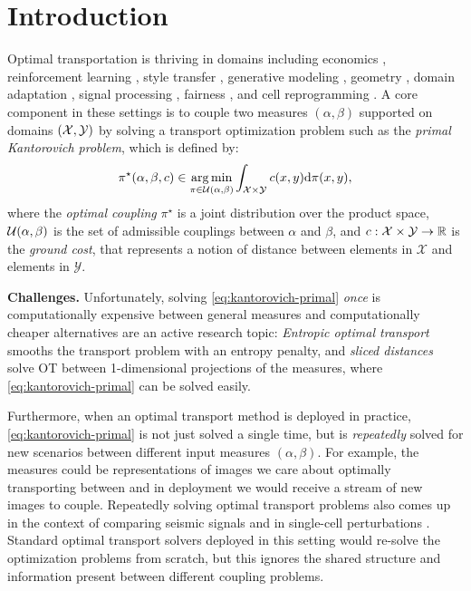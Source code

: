 \documentclass{article}
\begin{document}
\section{Introduction}
Optimal transportation \citep{villani2009optimal,ambrosio2003lecture,santambrogio2015optimal,peyre2019computational,merigot2021optimal} is thriving in domains including
economics \citep{galichon2016optimal},
reinforcement learning \citep{dadashi2021primal,fickinger2021cross},
style transfer \citep{kolkin2019style},
generative modeling \citep{arjovsky2017wasserstein,seguy2018large,huang2020convex,rout2021generative},
geometry \citep{solomon2015convolutional,cohen2021riemannian},
domain adaptation \citep{courty2017joint,redko2019optimal},
signal processing \citep{kolouri2017optimal},
fairness \citep{jiang2020wasserstein}, and cell reprogramming \citep{SCHIEBINGER2019928}.
A core component in these settings is to couple two
measures $(\alpha,\beta)$ supported on domains $({\mathcal{X}}, {\mathcal{Y}})$
by solving a transport optimization problem such as the
\emph{primal Kantorovich problem}, which is defined by:
\begin{equation}
  \pi^\star(\alpha, \beta, c)\in \operatorname*{arg\,min}_{\pi\in{\mathcal{U}}(\alpha, \beta)}
    \int_{{\mathcal{X}}\times {\mathcal{Y}}} c(x,y){\rm d}\pi(x,y),
  \label{eq:kantorovich-primal}
\end{equation}
where the \emph{optimal coupling} $\pi^\star$
is a joint distribution over the  product space,
${\mathcal{U}}(\alpha, \beta)$ is the set of admissible couplings
between $\alpha$ and $\beta$, and
$c: {\mathcal{X}}\times{\mathcal{Y}} \rightarrow \mathbb{R}$ is the \emph{ground cost}, that represents a notion of distance between elements in $\mathcal{X}$ and elements in $\mathcal{Y}$.

\textbf{Challenges.}
Unfortunately, solving \cref{eq:kantorovich-primal} \emph{once} is
computationally expensive between general measures  and
computationally cheaper alternatives are an active research topic:
\emph{Entropic optimal transport} \citep{cuturi2013sinkhorn}
smooths the transport problem with an entropy penalty, and
\emph{sliced distances}
\citep{kolouri2016sliced,kolouri2018sliced,kolouri2019generalized,deshpande2019max}
solve OT between 1-dimensional projections of the measures,
where \cref{eq:kantorovich-primal} can be solved easily.

Furthermore, when an optimal transport method is deployed
in practice, \cref{eq:kantorovich-primal} is not just solved a
single time, but is \emph{repeatedly} solved for new
scenarios between different input measures $(\alpha, \beta)$.
For example, the measures could be representations of images
we care about optimally transporting between and in deployment
we would receive a stream of new images to couple.
Repeatedly solving optimal transport problems also comes up in
the context of comparing seismic signals \citep{engquist2013application}
and in single-cell perturbations \citep{bunne2021learning,bunne2022proximal,bunne2022supervised}.
Standard optimal transport solvers deployed in this
setting would re-solve the optimization problems from
scratch, but this ignores the shared structure and
information present between different coupling problems.
\end{document}
